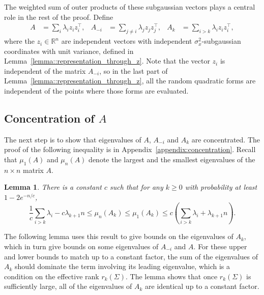 \documentclass[11pt,notitlepage]{article}
\newcommand\R {\mathbb{R}}
\renewcommand\Re{\R}
\newtheorem{lemma}[theorem]{Lemma}
\begin{document}
The weighted sum of outer products of these subgaussian vectors plays a
central role in the rest of the proof. Define
  \begin{align*}
    A & = \sum_{i} \lambda_i z_i z_i^\top, &
    A_{-i} & = \sum_{j \neq i} \lambda_j z_j z_j^\top, &
    A_k &= \sum_{i>k}\lambda_i z_i z_i^\top,
  \end{align*}
where the $z_i\in\Re^n$ are independent vectors with independent $\sigma_x^2$-subgaussian  coordinates with unit variance, defined in Lemma~\ref{lemma::representation_through_z}.
Note that the vector $z_i$ is independent of the matrix $A_{-i}$, so
in the last part of Lemma~\ref{lemma::representation_through_z},
all the random quadratic forms are independent of the points where
those forms are evaluated.

\subsection*{Concentration of $A$}

The next step is to show that eigenvalues of $A$, $A_{-i}$ and $A_k$ are
concentrated. The proof of the following inequality is in
Appendix~\ref{appendix:concentration}. Recall that $\mu_1(A)$ and $\mu_n(A)$
denote the largest and the smallest eigenvalues of the $n\times n$ matrix $A$.

\begin{lemma}\label{lemma::eig_bound}
 There is a constant $c$ such that for any $k \geq 0$ 
with probability at least $1 - 2e^{-n/c}$,
    \[
      \frac{1}{c}\sum_{i > k} \lambda_i - c\lambda_{k+1} n
        \leq \mu_n(A_k) \leq \mu_1(A_k)
        \leq c\left(\sum_{i> k} \lambda_i + \lambda_{k+1} n\right).
    \]
\end{lemma}

The following lemma uses this result to give bounds on the eigenvalues
of $A_k$, which in turn give bounds on some eigenvalues of $A_{-i}$
and $A$. For these upper and lower bounds to match up to a constant
factor, the sum of the eigenvalues of $A_k$ should dominate the term
involving its leading eigenvalue, which is a condition on the
effective rank $r_k(\Sigma)$.
The lemma shows that once $r_k(\Sigma)$ is
sufficiently large, all of the eigenvalues of $A_k$ are identical up
to a constant factor.
\end{document}
